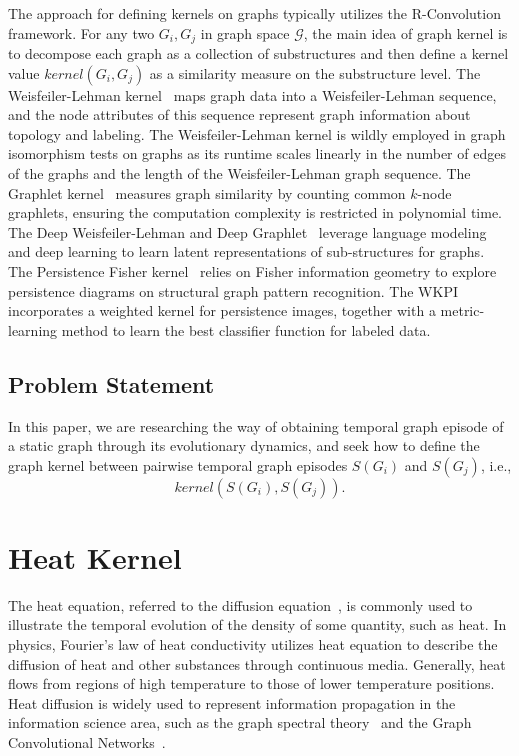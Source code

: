 \documentclass[10pt,journal,compsoc]{IEEEtran}
\begin{document}
The approach for defining kernels on graphs typically utilizes the R-Convolution framework. For any two $G_{i}, G_{j}$ in graph space $\mathcal{G}$, the main idea of graph kernel is to decompose each graph as a collection of substructures and then define a kernel value $kernel(G_{i}, G_{j})$ as a similarity measure on the substructure level. The Weisfeiler-Lehman kernel~\cite{WL-kernel} maps graph data into a Weisfeiler-Lehman sequence, and the node attributes of this sequence represent graph information about topology and labeling. The Weisfeiler-Lehman kernel is wildly employed in graph isomorphism tests on graphs as its runtime scales linearly in the number of edges of the graphs and the length of the Weisfeiler-Lehman graph sequence. The Graphlet kernel~\cite{GK-graphlet-kernel} measures graph similarity by counting common $k$-node graphlets, ensuring the computation complexity is restricted in polynomial time. The Deep Weisfeiler-Lehman and Deep Graphlet~\cite{Deep-graph-kernels} leverage language modeling and deep learning to learn latent representations of sub-structures for graphs. The Persistence Fisher kernel~\cite{Persistence-Fisher} relies on Fisher information geometry to explore persistence diagrams on structural graph pattern recognition. The WKPI~\cite{WKPI} incorporates a weighted kernel for persistence images, together with a metric-learning method to learn the best classifier function for labeled data.


\subsection{Problem Statement}
In this paper, we are researching the way of obtaining temporal graph episode of a static graph through its evolutionary dynamics, and seek how to define the graph kernel between pairwise temporal graph episodes $S(G_{i})$ and $S(G_{j})$, i.e.,
\begin{equation}\label{random-graph-episode}
  kernel(S(G_{i}), S(G_{j})).
\end{equation}


\section{Heat Kernel}\label{Section-Heat-Kernel}

The heat equation, referred to the diffusion equation~\cite{heat-diffusion, heat-kernel-community-detection, Heat-Kernel-diffusionrank}, is commonly used to illustrate the temporal evolution of the density of some quantity, such as heat. In physics, Fourier's law of heat conductivity utilizes heat equation to describe the diffusion of heat and other substances through continuous media. Generally, heat flows from regions of high temperature to those of lower temperature positions. Heat diffusion is widely used to represent information propagation in the information science area, such as the graph spectral theory~\cite{spectral-graph-theory} and the Graph Convolutional Networks~\cite{GCN}.
\end{document}
